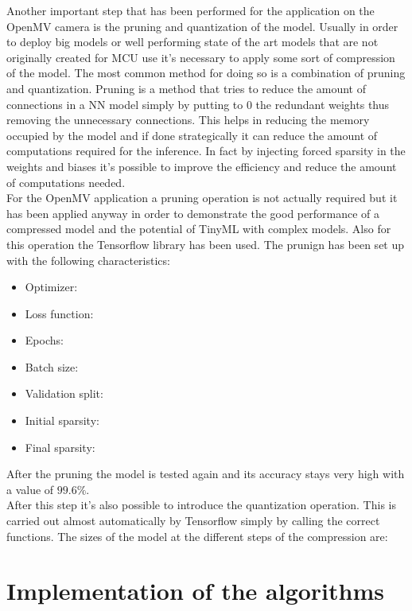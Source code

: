 \documentclass[12pt]{report}
\begin{document}
Another important step that has been performed for the application on the OpenMV camera is the pruning and quantization of the model. Usually in order to deploy big models or well performing state of the art models that are not originally created for MCU use it's necessary to apply some sort of compression of the model. The most common method for doing so is a combination of pruning and quantization. Pruning is a method that tries to reduce the amount of connections in a NN model simply by putting to 0 the redundant weights thus removing the unnecessary connections. This helps in reducing the memory occupied by the model and if done strategically it can reduce the amount of computations required for the inference. In fact by injecting forced sparsity in the weights and biases it's possible to improve the efficiency and reduce the amount of computations needed. \\
For the OpenMV application a pruning operation is not actually required but it has been applied anyway in order to demonstrate the good performance of a compressed model and the potential of TinyML with complex models. Also for this operation the Tensorflow library has been used. The prunign has been set up with the following characteristics:  
\begin{itemize}
	\item Optimizer:
	\item Loss function:
	\item Epochs:
	\item Batch size: 
	\item Validation split: 
	\item Initial sparsity: 
	\item Final sparsity:
\end{itemize}

After the pruning the model is tested again and its accuracy stays very high with a value of $99.6\%$.\\
After this step it's also possible to introduce the quantization operation. This is carried out almost automatically by Tensorflow simply by calling the correct functions. The sizes of the model at the different steps of the compression are: 






\section{Implementation of the algorithms}
\end{document}
